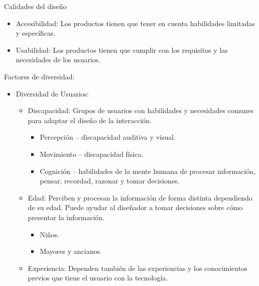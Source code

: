 \documentclass[12pt, twoside, openright]{report} %
\begin{document}
  Calidades del diseño

  \begin{itemize}
  
  \item
    Accesibilidad: Los productos tienen que tener en cuenta habilidades
    limitadas y específicas.
  \item
    Usabilidad: Los productos tienen que cumplir con los requisitos y
    las necesidades de los usuarios.
  \end{itemize}

  Factores de diversidad:

  \begin{itemize}
  
  \item
    Diversidad de Usuarios:

    \begin{itemize}
    
    \item
      Discapacidad: Grupos de usuarios con habilidades y necesidades
      comunes para adaptar el diseño de la interacción.

      \begin{itemize}
      
      \item
        Percepción -- discapacidad auditiva y visual.
      \item
        Movimiento -- discapacidad física.
      \item
        Cognición -- habilidades de la mente humana de procesar
        información, pensar, recordad, razonar y tomar decisiones.
      \end{itemize}
    \item
      Edad: Perciben y procesan la información de forma distinta
      dependiendo de su edad. Puede ayudar al diseñador a tomar
      decisiones sobre cómo presentar la información.

      \begin{itemize}
      
      \item
        Niños.
      \item
        Mayores y ancianos.
      \end{itemize}
    \item
      Experiencia: Dependen también de las experiencias y los
      conocimientos previos que tiene el usuario con la tecnología.

      \begin{itemize}
      

\end{itemize}
\end{itemize}
\end{itemize}
\end{document}
